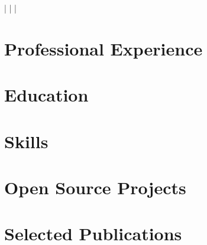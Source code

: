 \documentclass[a4paper,11pt]{article}
\begin{document}
    \begin{center}
        \myName
        \myWebsite | \myMailAddress | \myGithub | \myPhoneNumber
    \end{center}

    \profile

    \section{Professional Experience}
        \begin{itemize}
            \professor
                \cvItemizeBegin
                    \professorA
                    \professorB
                \cvItemizeEnd
            \postdoc
                \cvItemizeBegin
                    \postdocA
                    \postdocB
                \cvItemizeEnd
            \expFlowers
                \cvItemizeBegin
                    \expFlowersB
                \cvItemizeEnd
            \expInfineon
                \cvItemizeBegin
                    \expInfineonB
                \cvItemizeEnd
            \expSlive
                \cvItemizeBegin
                    \expSliveA
                    \expSliveB
                \cvItemizeEnd
        \end{itemize}

    \section{Education}
        \begin{itemize}
            \phd
            \msc
            \bsc
        \end{itemize}

    \section{Skills}
        \begin{itemize}
            \skillsProgramming
            \skillsLanguages
        \end{itemize}

    \section{Open Source Projects}
        \begin{itemize}
            \fossHPZ
                \cvItemizeBegin
                    \fossHPZB
                \cvItemizeEnd
            \fossConvSnn
                \cvItemizeBegin
                    \fossConvSnnA
                \cvItemizeEnd
        \end{itemize}

    \section{Selected Publications}
        \publicationItemizeBegin
            \publicationInCIT
            \publicationSpikingTransformer
            \seeGoogleScholar
        \publicationItemizeEnd
\end{document}

